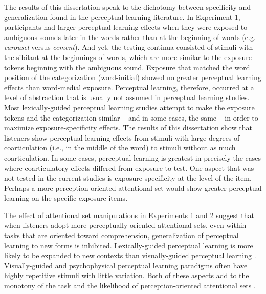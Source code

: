 The results of this dissertation speak to the dichotomy between specificity and generalization found in the perceptual learning literature. 
In Experiment 1, participants had larger perceptual learning effects when they were exposed to ambiguous sounds later in the words rather than at the beginning of words (e.g. \emph{carousel} versus \emph{cement}). 
And yet, the testing continua consisted of stimuli with the sibilant at the beginnings of words, which are more similar to the exposure tokens beginning with the ambiguous sound.
Exposure that matched the word position of the categorization (word-initial) showed no greater perceptual learning effects than word-medial exposure.
Perceptual learning, therefore, occurred at a level of abstraction that is usually not assumed in perceptual learning studies.
Most lexically-guided perceptual learning studies attempt to make the exposure tokens and the categorization similar -- and in some cases, the same -- in order to maximize exposure-specificity effects.
The results of this dissertation show that listeners show perceptual learning effects from stimuli with large degrees of coarticulation (i.e., in the middle of the word) to stimuli without as much coarticulation. 
In some cases, perceptual learning is greatest in precisely the cases where coarticulatory effects differed from exposure to test.
One aspect that was not tested in the current studies is exposure-specificity at the level of the item.
Perhaps a more perception-oriented attentional set would show greater perceptual learning on the specific exposure items.

The effect of attentional set manipulations in Experiments 1 and 2 suggest that when listeners adopt more perceptually-oriented attentional sets, even within tasks that are oriented toward comprehension, generalization of perceptual learning to new forms is inhibited.
Lexically-guided perceptual learning is more likely to be expanded to new contexts  than visually-guided perceptual learning \citetext{\citealp{Norris2003, Kraljic2008a,Reinisch2014}, but see \citealp{Mitterer2013}}.
Visually-guided and psychophysical perceptual learning paradigms often have highly repetitive stimuli with little variation.  
Both of these aspects add to the monotony of the task and the likelihood of perception-oriented attentional sets \citep{Cutler1987}.

